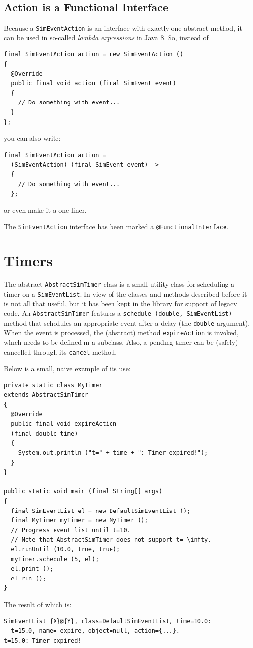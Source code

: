 \documentclass[12pt]{book}
\begin{document}
\subsection{Action is a Functional Interface}

Because a \lstinline|SimEventAction| is an interface with
  exactly one abstract method,
  it can be used in so-called {\em lambda expressions\/} in Java 8.
So, instead of

\begin{lstlisting}[basicstyle=\small]
final SimEventAction action = new SimEventAction ()
{
  @Override
  public final void action (final SimEvent event)
  {
    // Do something with event...
  }
};
\end{lstlisting}

you can also write:

\begin{lstlisting}[basicstyle=\small]
final SimEventAction action =
  (SimEventAction) (final SimEvent event) ->
  {
    // Do something with event...
  };
\end{lstlisting}

or even make it a one-liner.

The \lstinline{SimEventAction} interface has been marked a \lstinline|@FunctionalInterface|.

\section{Timers}

The abstract \lstinline|AbstractSimTimer| class is a small
  utility class for scheduling a timer on a \lstinline-SimEventList-.
In view of the classes and methods described before it
  is not all that useful, but it has been kept
  in the library for support of legacy code.
An \lstinline|AbstractSimTimer| features a
  \lstinline|schedule (double, SimEventList)| method
  that schedules an appropriate event after a delay
  (the \lstinline|double| argument).
When the event is processed,
  the (abstract) method \lstinline-expireAction- is invoked,
  which needs to be defined in a subclass.
Also, a pending timer can be (safely) cancelled
  through its \lstinline-cancel- method.

Below is a small, naive example of its use:
\begin{lstlisting}[basicstyle=\small]
private static class MyTimer
extends AbstractSimTimer
{
  @Override
  public final void expireAction
  (final double time)
  {
    System.out.println ("t=" + time + ": Timer expired!");
  }
}
  
public static void main (final String[] args)
{
  final SimEventList el = new DefaultSimEventList ();
  final MyTimer myTimer = new MyTimer ();
  // Progress event list until t=10.
  // Note that AbstractSimTimer does not support t=-\infty.
  el.runUntil (10.0, true, true);
  myTimer.schedule (5, el);
  el.print ();
  el.run ();
}
\end{lstlisting}
The result of which is:
\begin{lstlisting}[basicstyle=\footnotesize]
SimEventList {X}@{Y}, class=DefaultSimEventList, time=10.0:
  t=15.0, name=_expire, object=null, action={...}.
t=15.0: Timer expired!
\end{lstlisting}
\end{document}
